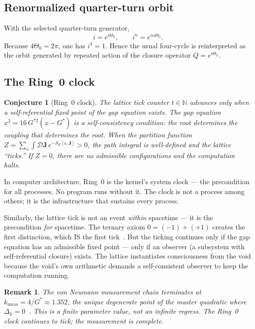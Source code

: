 \documentclass[11pt]{article}
\theoremstyle{tight}
\theoremstyle{plainroman}
\newtheorem{conjecture}[theorem]{Conjecture}
\newtheorem{remark}[theorem]{Remark}
\newcommand{\N}{\mathbb{N}}
\newcommand{\Thetaont}{\Theta_{0}}
\begin{document}
\subsection{Renormalized quarter-turn orbit}
With the selected quarter-turn generator,
\[
i=e^{i\Thetaont},
\qquad
i^n=e^{in\Thetaont}.
\]
Because $4\Thetaont=2\pi$, one has $i^4=1$.
Hence the usual four-cycle is reinterpreted as the orbit generated by repeated action of the closure operator $Q=e^{i\Thetaont}$.

\subsection{The Ring~0 clock}

\begin{conjecture}[Ring~0 clock]
The lattice tick counter $t\in\N$ advances only when a self-referential fixed point of the gap equation exists.
The gap equation $x^2=16\,G^{*2}(x-G^*)$ is a self-consistency condition: the root determines the coupling that determines the root.
When the partition function $Z=\sum_s\int\mathcal D\mathbf J\,e^{-S_E[s,\mathbf J]}>0$, the path integral is well-defined and the lattice ``ticks.'' If $Z=0$, there are no admissible configurations and the computation halts.
\end{conjecture}

In computer architecture, Ring~0 is the kernel's system clock --- the precondition for all processes.
No program runs without it.
The clock is not a process among others; it is the infrastructure that sustains every process.

Similarly, the lattice tick is not an event \emph{within} spacetime --- it is the precondition \emph{for} spacetime.
The ternary axiom $0=(-1)+(+1)$ creates the first distinction, which IS the first tick~\cite{ftdtime}.
But the ticking continues only if the gap equation has an admissible fixed point --- only if an observer (a subsystem with self-referential closure) exists.
The lattice instantiates consciousness from the void because the void's own arithmetic demands a self-consistent observer to keep the computation running.

\begin{remark}
The von Neumann measurement chain terminates at $k_{\text{meas}}=4/G^*\approx 1.352$, the unique degenerate point of the master quadratic where $\Delta_k=0$~\cite{ftdvnc}.
This is a finite parameter value, not an infinite regress.
The Ring~0 clock continues to tick; the measurement is complete.
\end{remark}
\end{document}
